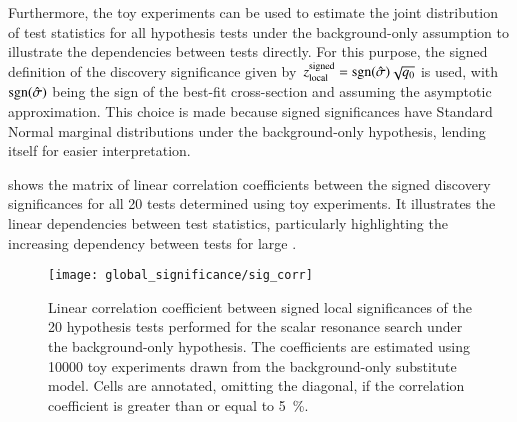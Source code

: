 
Furthermore, the toy experiments can be used to estimate the joint distribution
of test statistics for all hypothesis tests under the background-only assumption
to illustrate the dependencies between tests directly. For this purpose, the
signed definition of the discovery significance given
by~$z_{\text{local}}^{\text{signed}} = \operatorname{sgn}(\hat{\sigma}) \sqrt{q_0}$ is used,
with $\operatorname{sgn}(\hat{\sigma})$ being the sign of the best-fit cross-section and
assuming the asymptotic approximation. This choice is made because signed
significances have Standard Normal marginal distributions under the
background-only hypothesis, lending itself for easier interpretation.

 shows the matrix of linear correlation coefficients between
the signed discovery significances for all 20 tests determined using toy
experiments. It illustrates the linear dependencies between test statistics,
particularly highlighting the increasing dependency between tests for large \mX.

\begin{figure}[htbp]
  \centering

  \texttt{[image: global\_significance/sig\_corr]}

  \caption{Linear correlation coefficient between signed local significances of
    the 20 hypothesis tests performed for the scalar resonance search under the
    background-only hypothesis. The coefficients are estimated using \num{10000}
    toy experiments drawn from the background-only substitute model. Cells are
    annotated, omitting the diagonal, if the correlation coefficient is greater
    than or equal to \SI{5}{\percent}.}%
  \label{fig:corr_sig}
\end{figure}

